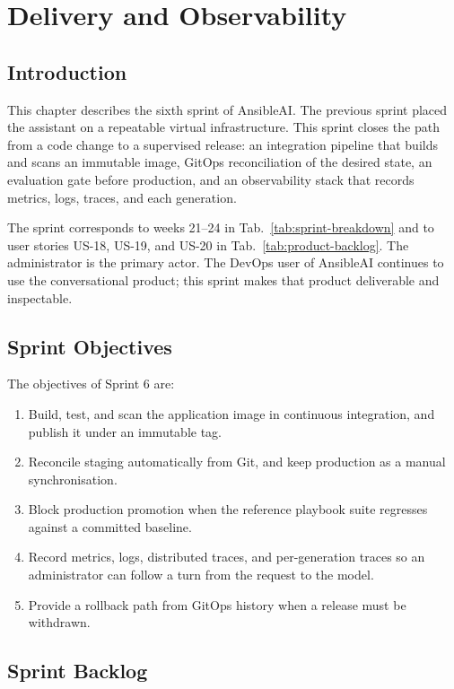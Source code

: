 \chapter{Delivery and Observability}
\label{chap:sprint6}

\section{Introduction}

This chapter describes the sixth sprint of AnsibleAI. The previous sprint placed the assistant on a repeatable virtual infrastructure. This sprint closes the path from a code change to a supervised release: an integration pipeline that builds and scans an immutable image, GitOps reconciliation of the desired state, an evaluation gate before production, and an observability stack that records metrics, logs, traces, and each generation.

The sprint corresponds to weeks 21--24 in Tab.~\ref{tab:sprint-breakdown} and to user stories US-18, US-19, and US-20 in Tab.~\ref{tab:product-backlog}. The administrator is the primary actor. The DevOps user of AnsibleAI continues to use the conversational product; this sprint makes that product deliverable and inspectable.

\section{Sprint Objectives}

The objectives of Sprint 6 are:

\begin{enumerate}[label=\arabic*.,leftmargin=2em,itemsep=0.25em]
  \item Build, test, and scan the application image in continuous integration, and publish it under an immutable tag.
  \item Reconcile staging automatically from Git, and keep production as a manual synchronisation.
  \item Block production promotion when the reference playbook suite regresses against a committed baseline.
  \item Record metrics, logs, distributed traces, and per-generation traces so an administrator can follow a turn from the request to the model.
  \item Provide a rollback path from GitOps history when a release must be withdrawn.
\end{enumerate}

\section{Sprint Backlog}

